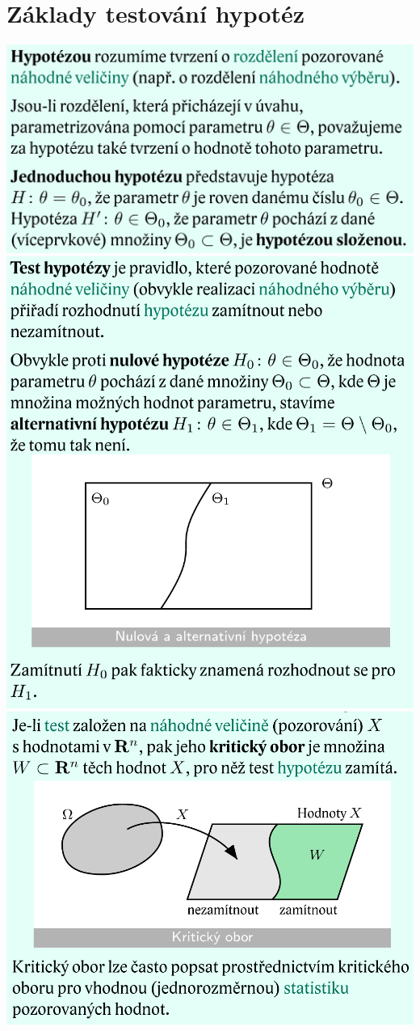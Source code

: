 \documentclass[12pt,a4paper]{article}
\begin{document}
\section{Základy testování hypotéz}
\begin{center}
	\includegraphics[scale=0.35]{img/testovani_hypotez_1}
	\includegraphics[scale=0.5]{img/testovani_hypotez_2}
	\includegraphics[scale=0.35]{img/testovani_hypotez_3}

\end{center}
\end{document}
